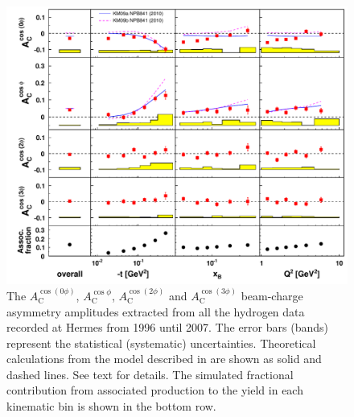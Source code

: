 \begin{figure}
  \begin{center}
    \includegraphics[width=15cm]{bcaplots_eml_par13_bin6_all_release_pic_update_withassoc}
    \caption{The $A_{\textrm{C}}^{\cos(0\phi)}$, $A_{\textrm{C}}^{\cos\phi}$, $A_{\textrm{C}}^{\cos(2\phi)}$ and $A_{\textrm{C}}^{\cos(3\phi)}$ beam-charge asymmetry amplitudes extracted from all the hydrogen data recorded at H{\sc ermes} from 1996 until 2007. The error bars (bands) represent the statistical (systematic) uncertainties.  Theoretical calculations from the model described in  \cite{Kum09} are shown as solid and dashed lines. See text for details. The simulated fractional contribution from associated production to the yield in each kinematic bin is shown in the bottom row.}
  \label{bca_xbjrange}
 \end{center}
\end{figure}

